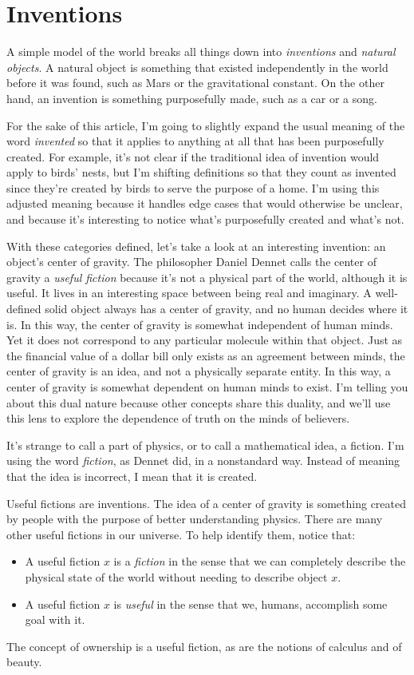 \documentclass[11pt, oneside]{article}
\begin{document}
\section{Inventions}

A simple model of the world breaks all things down into {\em inventions} and
{\em natural objects}.
A natural object is something that existed independently in the
world before it was found, such as Mars or the gravitational constant.
On the other hand, an
invention is something purposefully made, such as
a car or a song.

For the sake of this article, I'm going to slightly expand
the usual meaning of the word {\em invented} so that it applies
to anything at all that has been purposefully created.
For example,
it's not clear if the traditional idea of invention would apply to birds' nests,
but I'm shifting definitions so that they count as invented since
they're
created by birds to serve the purpose of a
home.
I'm using this adjusted meaning because it handles edge cases that would
otherwise be unclear, and because it's interesting to notice
what's purposefully created and what's not.

With these categories defined,
let's take a look at an interesting invention: an object's
center of gravity.
The philosopher Daniel Dennet calls the center of gravity
a {\em useful fiction}
because it's not a physical part of the world, although it is useful.
It lives in an interesting space between being real and imaginary.
A well-defined solid object always has a center of gravity,
and no human decides where it is.
In this way, the center of gravity
is somewhat independent of human minds.
Yet it does not correspond to any particular molecule within that object.
Just as the financial value of a dollar bill only exists as an agreement between
minds, the center of gravity is an idea, and not a physically separate
entity.
In this way, a center of gravity is somewhat dependent
on human minds to exist.
I'm telling you about this dual nature because
other concepts share this duality, and we'll use this lens to explore
the dependence of truth on the minds of believers.

It's strange to call a part of physics, or to call a mathematical idea, a
fiction. 
I'm using the word {\em fiction}, as Dennet did, in a
nonstandard way.
Instead of meaning that the idea is incorrect, I mean that it is created.

Useful fictions are inventions.
The idea of a center of gravity is something created by
people with the purpose of better understanding physics.
There are many other useful fictions in our universe. To help identify them,
notice that:
\begin{itemize}
    \item A useful fiction $x$ is a {\em fiction}
        in the sense that we can completely
        describe the physical state of the world without needing to describe
        object $x$.
    \item A useful fiction $x$ is {\em useful} in the sense that we, humans,
        accomplish some goal with it.
\end{itemize}
The concept of ownership is a useful fiction, as are the notions of
calculus and of beauty.
\end{document}
